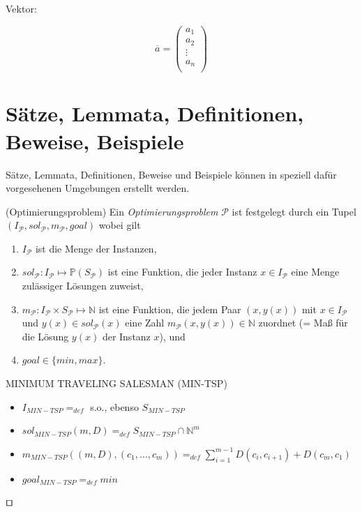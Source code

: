 Vektor:

\begin{equation}
	\overline{a} = \left(
		\begin{array}{c}
			a_{1}\\
			a_{2}\\
			\vdots\\
			a_{n}\\
		\end{array}
	\right)
\end{equation}

\section{Sätze, Lemmata, Definitionen, Beweise, Beispiele}

Sätze, Lemmata, Definitionen, Beweise und Beispiele können in speziell dafür vorgesehenen Umgebungen erstellt werden.

\begin{definition}(Optimierungsproblem)
Ein \emph{Optimierungsproblem} $\mathcal{P}$ ist festgelegt durch ein Tupel $(I_\mathcal{P}, sol_\mathcal{P}, m_\mathcal{P}, goal)$ wobei gilt

\begin{enumerate}
	\item $I_\mathcal{P}$ ist die Menge der Instanzen,
	\item $sol_\mathcal{P} : I_\mathcal{P} \longmapsto \mathbb{P}(S_\mathcal{P})$ ist eine Funktion, die jeder Instanz $x \in I_\mathcal{P}$ eine Menge zulässiger Lösungen zuweist,
	\item $m_\mathcal{P} : I_\mathcal{P} \times S_\mathcal{P} \longmapsto \mathbb{N}$ ist eine Funktion, die jedem Paar $(x,y(x))$ mit $x \in I_\mathcal{P}$ und $y(x) \in sol_\mathcal{P}(x)$ eine Zahl $m_\mathcal{P}(x,y(x)) \in \mathbb{N}$ zuordnet (= Maß für die Lösung $y(x)$ der Instanz $x$), und
	\item $goal \in \{min,max\}$.
\end{enumerate}
\end{definition}

\begin{example}
	MINIMUM TRAVELING SALESMAN (MIN-TSP)
	\begin{itemize}
		\item $I_{MIN-TSP} =_{def}$ s.o., ebenso $S_{MIN-TSP}$
		\item $sol_{MIN-TSP}(m,D) =_{def} S_{MIN-TSP} \cap \mathbb{N}^m$
		\item $m_{MIN-TSP}((m,D),(c_1, \ldots , c_m)) =_{def} \sum_{i=1}^{m-1} D(c_i, c_{i+1}) + D(c_m,c_1)$
		\item $goal_{MIN-TSP} =_{def} min$
	\end{itemize}
	\begin{flushright}$\qed$\end{flushright}
\end{example}

